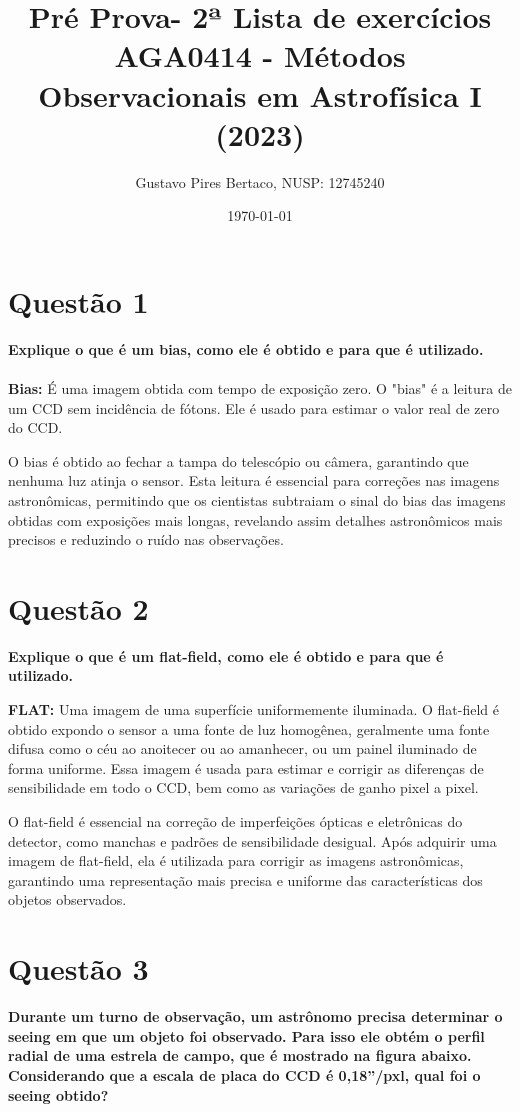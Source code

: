 \documentclass[a4paper, 12pt]{article}
\title{ \textbf{Pré Prova- 2ª Lista de exercícios} \\ AGA0414 - Métodos Observacionais em Astrofísica I (2023)}
\author{Gustavo Pires Bertaco, NUSP: 12745240}
\date{\today}
\begin{document}
\maketitle
\section*{\large Questão 1}
\noindent \textbf{Explique o que é um bias, como ele é obtido e para que é utilizado.} \\
\\ 
\textbf{Bias:} É uma imagem obtida com tempo de exposição zero. O "bias" é a leitura de um CCD sem incidência de fótons. Ele é usado para estimar o valor real de zero do CCD.

O bias é obtido ao fechar a tampa do telescópio ou câmera, garantindo que nenhuma luz atinja o sensor. Esta leitura é essencial para correções nas imagens astronômicas, permitindo que os cientistas subtraiam o sinal do bias das imagens obtidas com exposições mais longas, revelando assim detalhes astronômicos mais precisos e reduzindo o ruído nas observações.

\section*{Questão 2}
\noindent \textbf{Explique o que é um flat-field, como ele é obtido e para que é utilizado.}

\textbf{FLAT:} Uma imagem de uma superfície uniformemente iluminada. O flat-field é obtido expondo o sensor a uma fonte de luz homogênea, geralmente uma fonte difusa como o céu ao anoitecer ou ao amanhecer, ou um painel iluminado de forma uniforme. Essa imagem é usada para estimar e corrigir as diferenças de sensibilidade em todo o CCD, bem como as variações de ganho pixel a pixel.

O flat-field é essencial na correção de imperfeições ópticas e eletrônicas do detector, como manchas e padrões de sensibilidade desigual. Após adquirir uma imagem de flat-field, ela é utilizada para corrigir as imagens astronômicas, garantindo uma representação mais precisa e uniforme das características dos objetos observados.


\section*{Questão 3}
\noindent \textbf{Durante um turno de observação, um astrônomo precisa determinar o seeing em que um objeto foi observado. Para isso ele obtém o perfil radial de uma estrela de campo, que é mostrado na figura abaixo. Considerando que a escala de placa do CCD é 0,18”/pxl, qual foi o seeing obtido?} \\
\end{document}
